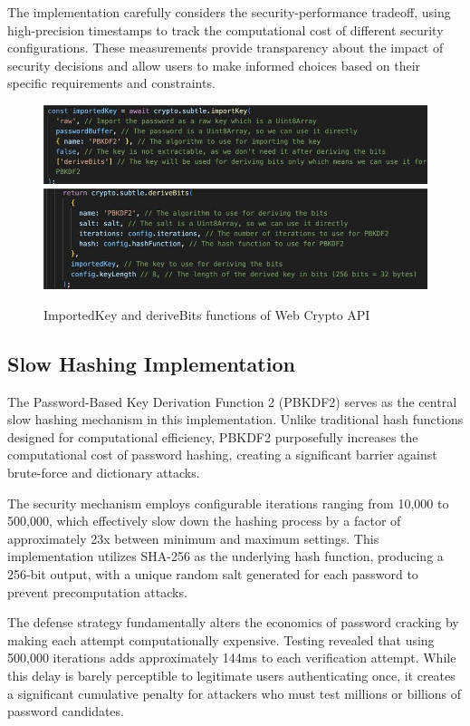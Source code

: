 \documentclass[11pt,a4paper]{article}
\begin{document}
The implementation carefully considers the security-performance tradeoff, using high-precision timestamps to track the computational cost of different security configurations. These measurements provide transparency about the impact of security decisions and allow users to make informed choices based on their specific requirements and constraints.
\begin{figure}[htbp]
  \centering
  \includegraphics[width=1\linewidth]{images/Algo1.jpg}
  \includegraphics[width= 1\linewidth]{images/Algo2.jpg}
  \caption{ImportedKey and deriveBits functions of Web Crypto API}
  \label{Algorithms}
\end{figure}

\subsection{Slow Hashing Implementation}
The Password-Based Key Derivation Function 2 (PBKDF2) serves as the central slow hashing mechanism in this implementation. Unlike traditional hash functions designed for computational efficiency, PBKDF2 purposefully increases the computational cost of password hashing, creating a significant barrier against brute-force and dictionary attacks.

The security mechanism employs configurable iterations ranging from 10,000 to 500,000, which effectively slow down the hashing process by a factor of approximately 23x between minimum and maximum settings. This implementation utilizes SHA-256 as the underlying hash function, producing a 256-bit output, with a unique random salt generated for each password to prevent precomputation attacks.

The defense strategy fundamentally alters the economics of password cracking by making each attempt computationally expensive. Testing revealed that using 500,000 iterations adds approximately 144ms to each verification attempt. While this delay is barely perceptible to legitimate users authenticating once, it creates a significant cumulative penalty for attackers who must test millions or billions of password candidates.
\end{document}
